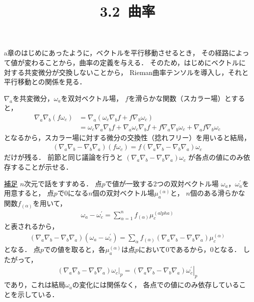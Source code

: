 \documentclass[a4paper]{jsarticle}
\title{3.2\ 曲率}
\begin{document}
\maketitle

a章のはじめにあったように，ベクトルを平行移動させるとき，
その経路によって値が変わることから，曲率の定義を与える．
そのため，はじめにベクトルに対する共変微分が交換しないことから，
Rieman曲率テンソルを導入し，それと平行移動との関係を見る．

$\nabla_a$を共変微分，$\omega_a$を双対ベクトル場，
$f$を滑らかな関数（スカラー場）とすると，
\begin{align}
	\nabla_a \nabla_b \left( f \omega_c \right)
	&= \nabla_a \left( \omega_c \nabla_b f + f \nabla_b \omega_c \right) \\
	&= \omega_c \nabla_a \nabla_b f + \nabla_a \omega_c \nabla_b f
	+ f \nabla_a \nabla_b \omega_c + \nabla_a f \nabla_b \omega_c
\end{align}
となるから，スカラー場に対する微分の交換性（捻れフリー）を用いると結局，
\begin{align}
	\left( \nabla_a \nabla_b - \nabla_b \nabla_a \right) \left( f \omega_c \right)
	= f \left( \nabla_a \nabla_b - \nabla_b \nabla_a \right) \omega_c
\end{align}
だけが残る．
前節と同じ議論を行うと
$\left( \nabla_a \nabla_b - \nabla_b \nabla_a \right) \omega_c$
が各点の値にのみ依存することが示せる．
\begin{itembox}[l]{\underline{補足}}
	$n$次元で話をすすめる．
	点$p$で値が一致する2つの双対ベクトル場
	$\omega_a$，$\omega^{\prime}_a$を用意すると，
	点$p$で$0$になる$n$個の双対ベクトル場$\mu^{(\alpha)}_a$と，
	$n$個のある滑らかな関数$f_{(\alpha)}$を用いて，
	\begin{align}
		\omega_a - \omega^{\prime}_c
		= \sum_{\alpha = 1}^n f_{(\alpha)} \mu^{(alpha)}_c
	\end{align}
	と表されるから，
	\begin{align}
		\left( \nabla_a \nabla_b - \nabla_b \nabla_a \right)
		\left( \omega_a - \omega^{\prime}_c \right)
		= \sum_{\alpha} f_{(\alpha)}
		\left( \nabla_a \nabla_b - \nabla_b \nabla_a \right)\mu^{(\alpha)}_c
	\end{align}
	となる．
	点$p$での値を取ると，各$\mu^{(\alpha)}_a$は点$p$において0であるから，0となる．
	したがって，
	\begin{align}
		\left. \left( \nabla_a \nabla_b - \nabla_b \nabla_a \right)
		\omega_c \right|_p
		= \left. \left( \nabla_a \nabla_b - \nabla_b \nabla_a \right)
		\omega^{\prime}_c \right|_p
	\end{align}
	であり，これは結局$\omega_a$の変化には関係なく，
	各点での値にのみ依存していることを示している．
\end{itembox}
\end{document}
